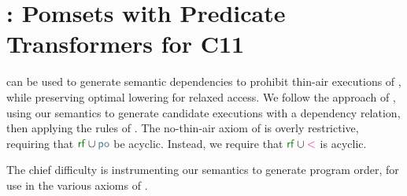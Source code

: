 \section{\PwTcTITLE: Pomsets with Predicate Transformers for C11}
\label{sec:c11}

\PwT{} can be used to generate semantic dependencies to prohibit thin-air
executions of \cXI, while preserving optimal lowering for relaxed access.  We
follow the approach of \citet{DBLP:conf/esop/PaviottiCPWOB20}, using our
semantics to generate \cXI{} candidate executions with a dependency relation,
then applying the rules of \rcXI{} \cite{DBLP:conf/pldi/LahavVKHD17}.  The
no-thin-air axiom of \rcXI{} is overly restrictive, requiring that
${\rrfx}\cup{\rpox}$ be acyclic.  Instead, we require that ${\rrfx}\cup{\lt}$
is acyclic.

The chief difficulty is instrumenting our semantics to generate program
order, for use in the various axioms of \cXI{}.

